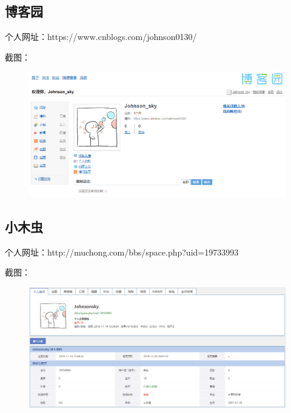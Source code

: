\documentclass{article}
\begin{document}
\subsection{博客园}

个人网址：https://www.cnblogs.com/johnson0130/

截图：
\begin{figure}[H]
    \centering
    \includegraphics[scale=0.5]{F6}
    \label{fig:F6}
\end{figure}

\subsection{小木虫}

个人网址：http://muchong.com/bbs/space.php?uid=19733993

截图：
\begin{figure}[H]
    \centering
    \includegraphics[scale=0.5]{F7}
    \label{fig:F7}
\end{figure}
\end{document}
